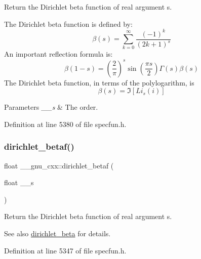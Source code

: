 Return the Dirichlet beta function of real argument {\ttfamily s}.

The Dirichlet beta function is defined by\+: \[ \beta(s) = \sum_{k=0}^\infty \frac{(-1)^k}{(2k+1)^s} \] An important reflection formula is\+: \[ \beta(1-s) = \left( \frac{2}{\pi}\right)^s \sin(\frac{\pi s}{2}) \Gamma(s) \beta(s) \] The Dirichlet beta function, in terms of the polylogarithm, is \[ \beta(s) = \Im[Li_s(i)] \]


\begin{DoxyParams}{Parameters}
{\em \+\_\+\+\_\+s} & The order. \\
\hline
\end{DoxyParams}


Definition at line 5380 of file specfun.\+h.

\mbox{\label{group__mathsf__gnu_ga9bb40e20b18e3eb822e70af955940830}} 
\subsubsection{\texorpdfstring{dirichlet\+\_\+betaf()}{dirichlet\_betaf()}}
{\footnotesize\ttfamily float \+\_\+\+\_\+gnu\+\_\+cxx\+::dirichlet\+\_\+betaf (\begin{DoxyParamCaption}\item[{float}]{\+\_\+\+\_\+s }\end{DoxyParamCaption})\hspace{0.3cm}{\ttfamily [inline]}}

Return the Dirichlet beta function of real argument {\ttfamily s}.

\begin{DoxySeeAlso}{See also}
\hyperlink{group__mathsf__gnu_ga87466a2d429a2815d794acc21c882b08}{dirichlet\+\_\+beta} for details. 
\end{DoxySeeAlso}


Definition at line 5347 of file specfun.\+h.

\mbox{\label{group__mathsf__gnu_gaed6fd85a4577f4de66d74742a1850a13}} 
